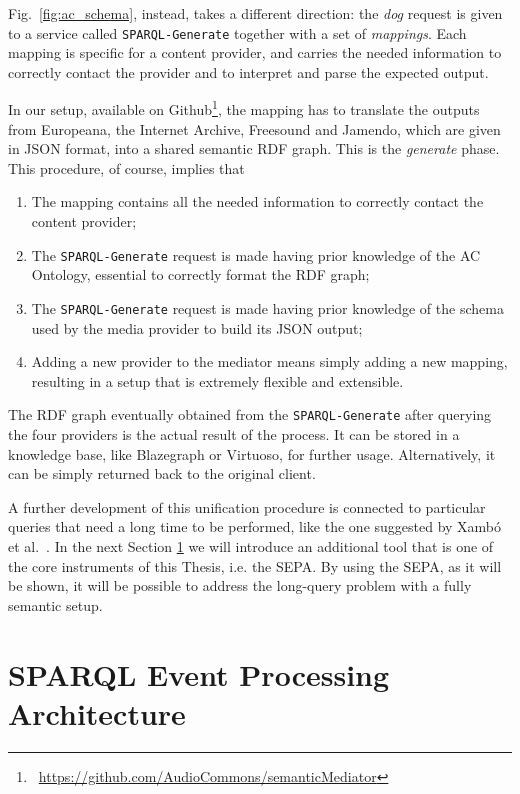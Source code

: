 Fig.~\ref{fig:ac_schema}, instead, takes a different direction: the \textit{dog} request is given to a service called \texttt{SPARQL-Generate} \cite{lefranccois2017sparql, lefranccois2016flexible} together with a set of \textit{mappings}. Each mapping is specific for a content provider, and carries the needed information to correctly contact the provider and to interpret and parse the expected output.

In our setup, available on Github\footnote{\faGithub~\url{https://github.com/AudioCommons/semanticMediator}}, the mapping has to translate the outputs from Europeana, the Internet Archive, Freesound and Jamendo, which are given in JSON format, into a shared semantic RDF graph. This is the \textit{generate} phase. This procedure, of course, implies that
\begin{enumerate}
\item The mapping contains all the needed information to correctly contact the content provider;
\item The \texttt{SPARQL-Generate} request is made having prior knowledge of the AC Ontology, essential to correctly format the RDF graph;
\item The \texttt{SPARQL-Generate} request is made having prior knowledge of the schema used by the media provider to build its JSON output;
\item Adding a new provider to the mediator means simply adding a new mapping, resulting in a setup that is extremely flexible and extensible.
\end{enumerate}

The RDF graph eventually obtained from the \texttt{SPARQL-Generate} after querying the four providers is the actual result of the process. It can be stored in a knowledge base, like Blazegraph or Virtuoso, for further usage. Alternatively, it can be simply returned back to the original client.

A further development of this unification procedure is connected to particular queries that need a long time to be performed, like the one suggested by Xamb\'o et al.~\cite{xambo2018jam}. In the next Section \ref{sec:siot_sepa} we will introduce an additional tool that is one of the core instruments of this Thesis, i.e. the SEPA. By using the SEPA, as it will be shown, it will be possible to address the long-query problem with a fully semantic setup.

\section{SPARQL Event Processing Architecture}
\label{sec:siot_sepa}

